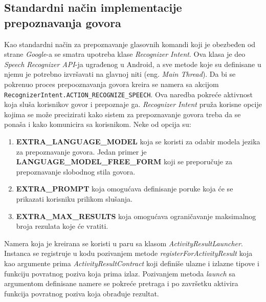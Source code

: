 \documentclass[struktura.tex]{subfiles}
\begin{document}
\subsection{Standardni način implementacije prepoznavanja govora}
Kao standardni način za prepoznavanje glasovnih komandi koji je obezbeđen od strane \textit{Google}-a se smatra upotreba klase \textit{Recognizer Intent}. Ova klasa je deo \textit{Speech Recognizer API}-ja ugrađenog u Android, a sve metode koje su definisane u njemu je potrebno izvršavati na glavnoj niti (eng. \textit{Main Thread}). Da bi se pokrenuo proces prepooznavanja govora kreira se namera sa akcijom \verb|RecognizerIntent.ACTION_RECOGNIZE_SPEECH|. Ova naredba pokreće aktivnost koja sluša korisnikov govor i prepoznaje ga. \textit{Recognizer Intent} pruža korisne opcije kojima se može precizirati kako sistem za prepoznavanje govora treba da se ponaša i kako komunicira sa korisnikom. Neke od opcija su:
\begin{enumerate}
    \item \textbf{EXTRA\_LANGUAGE\_MODEL} koja se koristi za odabir modela jezika za prepoznavanje govora. Jedan primer je \textbf{LANGUAGE\_MODEL\_FREE\_FORM} koji se preporučuje za prepoznavanje slobodnog stila govora.
    \item \textbf{EXTRA\_PROMPT} koja omogućava definisanje poruke koja će se prikazati korisniku prilikom slušanja.
    \item \textbf{EXTRA\_MAX\_RESULTS} koja omogućava ograničavanje maksimalnog broja rezulata koje će vratiti.
\end{enumerate}

Namera koja je kreirana se koristi u paru sa klasom \textit{ActivityResultLauncher}. Instanca se registruje u kodu pozivanjem metode \textit{registerForActivityResult} koja kao argumente prima \textit{ActivityResultContract} koji definiše ulazne i izlazne tipove i funkciju povratnog poziva koja prima izlaz. Pozivanjem metoda \textit{launch} sa argumentom definisane namere se pokreće pretraga i po završetku aktivira funkcija povratnog poziva koja obrađuje rezultat.
\end{document}
